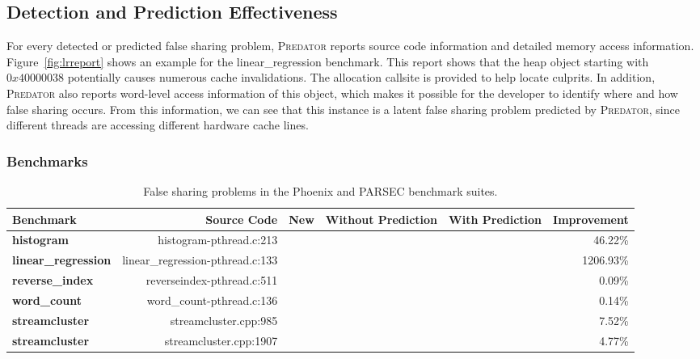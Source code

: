 \documentclass[10pt]{sigplanconf}
\newcommand{\cmark}{\ding{52}}
\newcommand{\Predator}{{\scshape Predator}}
\begin{document}
\subsection{Detection and Prediction Effectiveness}
\label{sec:effective}

For every detected or predicted false sharing problem, \Predator{} reports source code information and detailed memory access information. Figure~\ref{fig:lrreport} shows an example for the linear\_regression benchmark. This report shows that the heap object starting with $0x40000038$ potentially causes numerous cache invalidations. The allocation callsite is provided to help locate culprits. In addition, \Predator{} also reports word-level access information of this object, which makes it possible for the developer to identify where and how false sharing occurs. From this information, we can see that this instance is a latent false sharing problem predicted by \Predator{}, since different threads are accessing different hardware cache lines.


\subsubsection{Benchmarks}
\label{sec:benchmarks}

\begin{table}[!t]
{\centering\begin{tabular}{l|r|r|r|r|r}\hline
{\bf \small Benchmark} & {\bf \small Source Code} & {\bf \small New} & {\bf \small Without Prediction} &{\bf \small With Prediction} & {\bf \small Improvement} \\
\hline
\small \textbf{histogram} & {\small histogram-pthread.c:213} & \cmark{} &\cmark{} & \cmark{} & 46.22\%\\
\small \textbf{linear\_regression} & {\small linear\_regression-pthread.c:133} & & & \cmark{} & 1206.93\% \\
\small \textbf{reverse\_index} & {\small reverseindex-pthread.c:511} & & \cmark{} & \cmark{} & 0.09\%\\
\small \textbf{word\_count} & {\small word\_count-pthread.c:136} & & \cmark{} & \cmark{} & 0.14\%\\
\hline
\small \textbf{streamcluster} & {\small streamcluster.cpp:985} &  & \cmark{} & \cmark{} &7.52\% \\
\small \textbf{streamcluster} & {\small streamcluster.cpp:1907} & \cmark{} & \cmark{} & \cmark{} & 4.77\%\\
\hline
\end{tabular}
\caption{False sharing problems in the Phoenix and PARSEC benchmark suites. \label{table:detection}}
}
\end{table}
\end{document}

